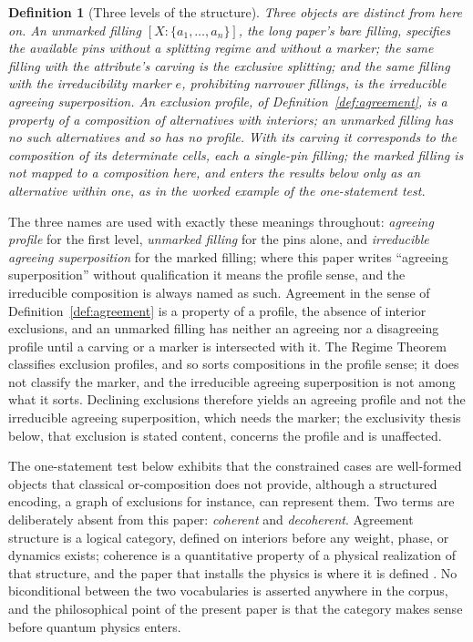 \documentclass[11pt]{article}
\newtheorem{definition}{Definition}
\begin{document}
\begin{definition}[Three levels of the structure]\label{def:irreducible-level}
Three objects are distinct from here on. An \emph{unmarked filling} $[X : \{a_1, \ldots, a_n\}]$, the long paper's bare filling, specifies the available pins without a splitting regime and without a marker; the same filling with the attribute's carving is the \emph{exclusive splitting}; and the same filling with the irreducibility marker $e$, prohibiting narrower fillings, is the \emph{irreducible agreeing superposition}. An exclusion profile, of Definition~\ref{def:agreement}, is a property of a composition of alternatives with interiors; an unmarked filling has no such alternatives and so has no profile. With its carving it corresponds to the composition of its determinate cells, each a single-pin filling; the marked filling is not mapped to a composition here, and enters the results below only as an alternative within one, as in the worked example of the one-statement test.
\end{definition}
\noindent The three names are used with exactly these meanings throughout: \emph{agreeing profile} for the first level, \emph{unmarked filling} for the pins alone, and \emph{irreducible agreeing superposition} for the marked filling; where this paper writes ``agreeing superposition'' without qualification it means the profile sense, and the irreducible composition is always named as such. Agreement in the sense of Definition~\ref{def:agreement} is a property of a profile, the absence of interior exclusions, and an unmarked filling has neither an agreeing nor a disagreeing profile until a carving or a marker is intersected with it. The Regime Theorem classifies exclusion profiles, and so sorts compositions in the profile sense; it does not classify the marker, and the irreducible agreeing superposition is not among what it sorts. Declining exclusions therefore yields an agreeing profile and not the irreducible agreeing superposition, which needs the marker; the exclusivity thesis below, that exclusion is stated content, concerns the profile and is unaffected.

\noindent The one-statement test below exhibits that the constrained cases are well-formed objects that classical or-composition does not provide, although a structured encoding, a graph of exclusions for instance, can represent them. Two terms are deliberately absent from this paper: \emph{coherent} and \emph{decoherent}. Agreement structure is a logical category, defined on interiors before any weight, phase, or dynamics exists; coherence is a quantitative property of a physical realization of that structure, and the paper that installs the physics is where it is defined \parencite{AethusQuant}. No biconditional between the two vocabularies is asserted anywhere in the corpus, and the philosophical point of the present paper is that the category makes sense before quantum physics enters.
\end{document}
